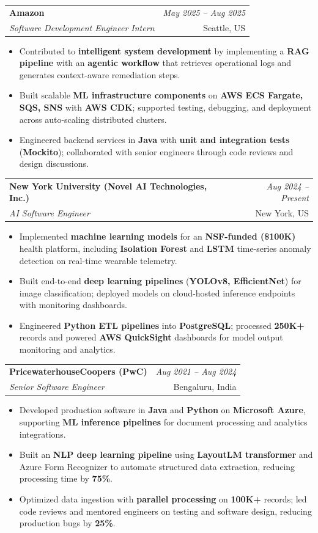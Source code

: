 \documentclass[a4paper,10pt]{article}
\makeatletter
\newcommand{\resumeSubheading}[4]{
\vspace{0.3mm}\item
    \begin{tabular*}{0.98\textwidth}[t]{l@{\extracolsep{\fill}}r}
        \textbf{#1} & \textit{\footnotesize{#4}} \\
        \textit{\footnotesize{#3}} & \footnotesize{#2}\\
    \end{tabular*}\vspace{-2mm}
}
\newcommand{\resumeItemListStart}{\begin{itemize}[leftmargin=*, labelsep=1mm, itemsep=0pt]}
\newcommand{\resumeItemListEnd}{\end{itemize}\vspace{-2mm}}
\makeatother
\begin{document}
\resumeSubheading
{Amazon}{Seattle, US}
{Software Development Engineer Intern}{May 2025 -- Aug 2025}
\resumeItemListStart
\item \footnotesize{Contributed to \textbf{intelligent system development} by implementing a \textbf{RAG pipeline} with an \textbf{agentic workflow} that retrieves operational logs and generates context-aware remediation steps.}
\item \footnotesize{Built scalable \textbf{ML infrastructure components} on \textbf{AWS ECS Fargate, SQS, SNS} with \textbf{AWS CDK}; supported testing, debugging, and deployment across auto-scaling distributed clusters.}
\item \footnotesize{Engineered backend services in \textbf{Java} with \textbf{unit and integration tests} (\textbf{Mockito}); collaborated with senior engineers through code reviews and design discussions.}
\resumeItemListEnd

\resumeSubheading
{New York University (Novel AI Technologies, Inc.)}{New York, US}
{AI Software Engineer}{Aug 2024 -- Present}
\resumeItemListStart
\item \footnotesize{Implemented \textbf{machine learning models} for an \textbf{NSF-funded (\$100K)} health platform, including \textbf{Isolation Forest} and \textbf{LSTM} time-series anomaly detection on real-time wearable telemetry.}
\item \footnotesize{Built end-to-end \textbf{deep learning pipelines} (\textbf{YOLOv8, EfficientNet}) for image classification; deployed models on cloud-hosted inference endpoints with monitoring dashboards.}
\item \footnotesize{Engineered \textbf{Python ETL pipelines} into \textbf{PostgreSQL}; processed \textbf{250K+} records and powered \textbf{AWS QuickSight} dashboards for model output monitoring and analytics.}
\resumeItemListEnd

\resumeSubheading
{PricewaterhouseCoopers (PwC)}{Bengaluru, India}
{Senior Software Engineer}{Aug 2021 -- Aug 2024}
\resumeItemListStart
\item \footnotesize{Developed production software in \textbf{Java} and \textbf{Python} on \textbf{Microsoft Azure}, supporting \textbf{ML inference pipelines} for document processing and analytics integrations.}
\item \footnotesize{Built an \textbf{NLP deep learning pipeline} using \textbf{LayoutLM transformer} and Azure Form Recognizer to automate structured data extraction, reducing processing time by \textbf{75\%}.}
\item \footnotesize{Optimized data ingestion with \textbf{parallel processing} on \textbf{100K+} records; led code reviews and mentored engineers on testing and software design, reducing production bugs by \textbf{25\%}.}
\resumeItemListEnd
\end{document}
